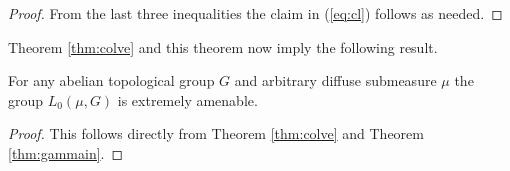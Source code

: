\begin{proof}
  From the last three inequalities the claim in (\ref{eq:cl}) follows as needed.
\end{proof}

Theorem \ref{thm:colve} and this theorem now imply the following result.

\begin{thm}
  For any abelian topological group $G$ and arbitrary diffuse submeasure $\mu$ the group $L_0(\mu, G)$ is extremely amenable.
\end{thm}

\begin{proof}
  This follows directly from Theorem \ref{thm:colve} and Theorem \ref{thm:gammain}.
\end{proof}
